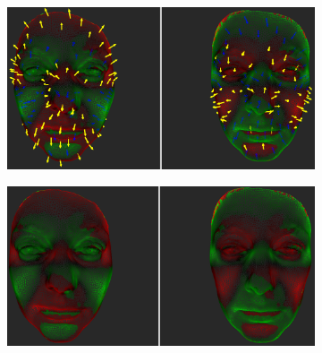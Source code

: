 \begin{figure}[h]
\centering
\begin{subfigure}{0.4\textwidth}
\includegraphics[width=\textwidth]{./screenshots/pair10.PNG}
\caption{}
\label{fig:study-3-10}
\end{subfigure}
\quad
\begin{subfigure}{0.4\textwidth}
\includegraphics[width=\textwidth]{./screenshots/pair7.PNG}
\caption{}
\label{fig:study-3-7}
\end{subfigure}


\end{figure}

